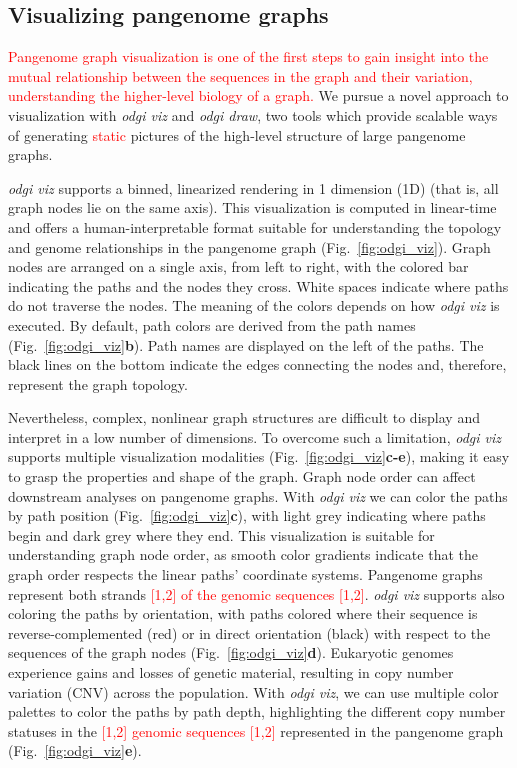 \documentclass{bioinfo}
\newcommand{\REVIEWED}[1]{{\textcolor{Red}{#1}}}
\begin{document}
\subsection{Visualizing pangenome graphs}
\label{sec:viz}


\REVIEWED{Pangenome graph visualization is one of the first steps to gain insight into the mutual relationship between the sequences in the graph and their variation, understanding the higher-level biology of a graph.}
We pursue a novel approach to visualization with \textit{odgi viz} and \textit{odgi draw}, two tools which provide scalable ways of generating \REVIEWED{static} pictures of the high-level structure of large pangenome graphs.

\textit{odgi viz} supports a binned, linearized rendering in 1 dimension (1D) (that is, all graph nodes lie on the same axis).
This visualization is computed in linear-time and offers a human-interpretable format suitable for understanding the topology and genome relationships in the pangenome graph (Fig.~\ref{fig:odgi_viz}).
Graph nodes are arranged on a single axis, from left to right, with the colored bar indicating the paths and the nodes they cross.
White spaces indicate where paths do not traverse the nodes.
The meaning of the colors depends on how \textit{odgi viz} is executed.
By default, path colors are derived from the path names (Fig.~\ref{fig:odgi_viz}\textbf{b}).
Path names are displayed on the left of the paths.
The black lines on the bottom indicate the edges connecting the nodes and, therefore, represent the graph topology.

Nevertheless, complex, nonlinear graph structures are difficult to display and interpret in a low number of dimensions.
To overcome such a limitation, \textit{odgi viz} supports multiple visualization modalities (Fig.~\ref{fig:odgi_viz}\textbf{c-e}), making it easy to grasp the properties and shape of the graph.
Graph node order can affect downstream analyses on pangenome graphs.
With \textit{odgi viz} we can color the paths by path position (Fig.~\ref{fig:odgi_viz}\textbf{c}), with light grey indicating where paths begin and dark grey where they end.
This visualization is suitable for understanding graph node order, as smooth color gradients indicate that the graph order respects the linear paths' coordinate systems.
Pangenome graphs represent both strands \REVIEWED{[1,2] of the genomic sequences [1,2]}.
\textit{odgi viz} supports also coloring the paths by orientation, with paths colored where their sequence is reverse-complemented (red) or in direct orientation (black) with respect to the sequences of the graph nodes (Fig.~\ref{fig:odgi_viz}\textbf{d}).
Eukaryotic genomes experience gains and losses of genetic material, resulting in copy number variation (CNV) across the population.
With \textit{odgi viz}, we can use multiple color palettes to color the paths by path depth, highlighting the different copy number statuses in the \REVIEWED{[1,2] genomic sequences [1,2]} represented in the pangenome graph (Fig.~\ref{fig:odgi_viz}\textbf{e}).
\end{document}
